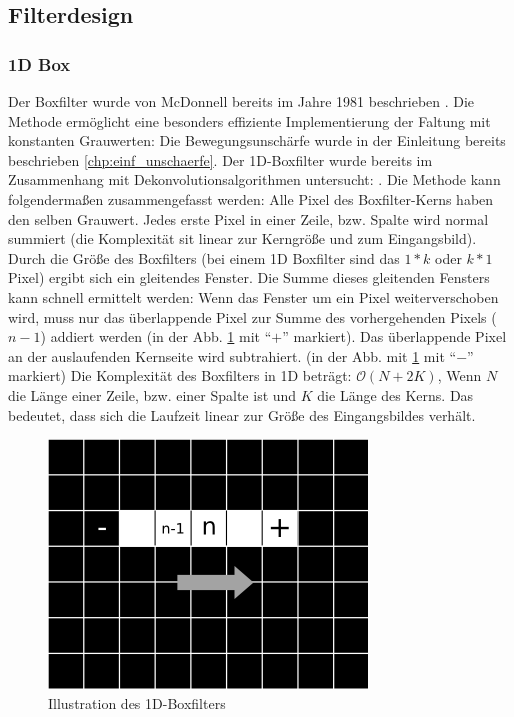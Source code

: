 \documentclass[a4paper,12pt]{article}
\begin{document}
\subsection{Filterdesign}\label{chp:filterdesign}
\subsubsection{1D Box}\label{chp:1dBox}
Der Boxfilter wurde von McDonnell bereits im Jahre 1981 beschrieben
\cite{mcdonnell}. Die Methode ermöglicht eine besonders effiziente
Implementierung der Faltung mit konstanten Grau\-werten: Die Bewegungsunschärfe
wurde in der Einleitung bereits beschrieben \ref{chp:einf_unschaerfe}.
Der 1D-Boxfilter wurde bereits im Zusammenhang
mit Dekonvolutionsalgorithmen untersucht: \cite{vimpaper}.
Die Methode kann folgendermaßen zusammengefasst werden:
Alle Pixel des Boxfilter-Kerns haben den selben Grauwert. Jedes erste Pixel in
einer Zeile, bzw. Spalte wird normal summiert (die Komplexität sit linear zur
Kerngröße und zum Eingangsbild). Durch die Größe des Boxfilters (bei einem 1D
Boxfilter sind das $1 \ast k$ oder $k \ast 1$ Pixel) ergibt sich ein gleitendes
Fenster.
Die Summe dieses gleitenden Fensters kann schnell ermittelt werden: Wenn das
Fenster um ein Pixel weiterverschoben wird, muss nur das überlappende Pixel zur
Summe des vorhergehenden Pixels ($n-1$) addiert werden (in der Abb.
\ref{figure_box} mit "`$+$"' markiert).
Das überlappende Pixel an der auslaufenden Kernseite wird subtrahiert.
(in der Abb. mit \ref{figure_box} mit "`$-$"' markiert)
Die Komplexität des Boxfilters in 1D beträgt: $\mathcal O(N+2K)$, Wenn $N$ die
Länge einer Zeile, bzw. einer Spalte ist und $K$ die Länge des Kerns. Das
bedeutet, dass sich die Laufzeit linear zur Größe des Eingangsbildes verhält.
  
\begin{figure}[htbp]
\centering
\includegraphics[scale=2.0]{Box1Di.png}
\caption{Illustration des 1D-Boxfilters}
\label{figure_box}
\end{figure}
\end{document}
